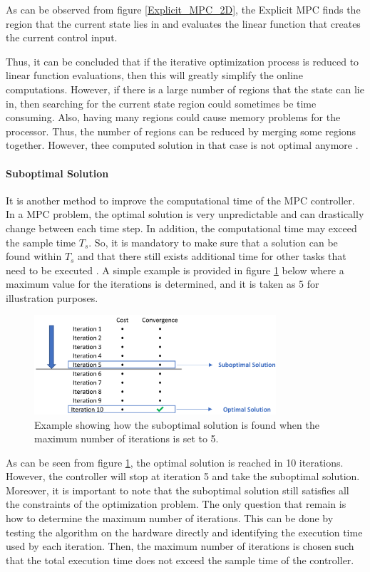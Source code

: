 \documentclass{thesisreport}
\begin{document}
\noindent As can be observed from figure \ref{Explicit_MPC_2D}, the Explicit MPC finds the  region that the current state lies in and evaluates the linear function that creates the current control input.

\noindent Thus, it can be concluded that if the iterative optimization process is reduced to linear function evaluations, then this will greatly simplify the online computations. However, if there is a large number of regions that the state can lie in, then searching for the current state region could sometimes be time consuming. Also, having many regions could cause memory problems for the processor. Thus, the number of regions can be reduced by merging some regions together. However, thee computed solution in that case is not optimal anymore \cite{Hovland2008}.

\paragraph{Suboptimal Solution}
It is another method to improve the computational time of the MPC controller. In a MPC problem, the optimal solution is very unpredictable and can drastically change between each time step. In addition, the computational time may exceed the sample time $T_s$. So, it is mandatory to make sure that a solution can be found within $T_s$ and that there still exists additional time for other tasks that need to be executed \cite{Gulez2014}. A simple example is provided in figure \ref{Suboptimal_solution_example} below where a maximum value for the iterations is determined, and it is taken as 5 for illustration purposes. 


\begin{figure}[h]
\centering
\includegraphics[width=0.8\textwidth]{Images/Control/Suboptimal_Solution.png}
\caption{Example showing how the suboptimal solution is found when the maximum number of iterations is set to 5.}
\label{Suboptimal_solution_example}
\end{figure}

\noindent As can be seen from figure \ref{Suboptimal_solution_example}, the optimal solution is reached in 10 iterations. However, the controller will stop at iteration 5 and take the suboptimal solution. Moreover, it is important to note that the suboptimal solution still satisfies all the constraints of the optimization problem. The only question that remain is how to determine the maximum number of iterations. This can be done by testing the algorithm on the hardware directly and identifying the execution time used by each iteration. Then, the maximum number of iterations is chosen such that the total execution time does not exceed the sample time of the controller.
\end{document}
